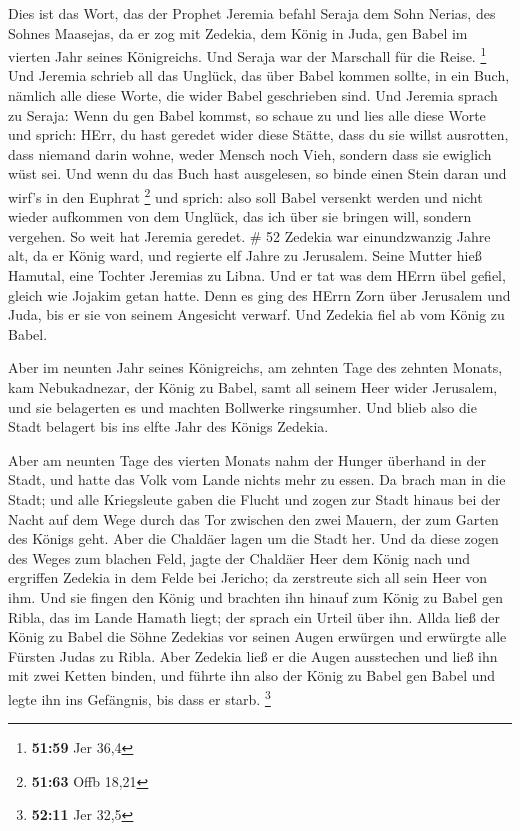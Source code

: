  Dies ist das Wort, das der Prophet Jeremia befahl Seraja
dem Sohn Nerias, des Sohnes Maasejas, da er zog mit Zedekia, dem König
in Juda, gen Babel im vierten Jahr seines Königreichs. Und Seraja war
der Marschall für die Reise. \footnote{\textbf{51:59} Jer 36,4}
 Und Jeremia schrieb all das Unglück, das über Babel kommen
sollte, in ein Buch, nämlich alle diese Worte, die wider Babel
geschrieben sind.  Und Jeremia sprach zu Seraja: Wenn du
gen Babel kommst, so schaue zu und lies alle diese Worte 
und sprich: HErr, du hast geredet wider diese Stätte, dass du sie willst
ausrotten, dass niemand darin wohne, weder Mensch noch Vieh, sondern
dass sie ewiglich wüst sei.  Und wenn du das Buch hast
ausgelesen, so binde einen Stein daran und wirf's in den Euphrat
\footnote{\textbf{51:63} Offb 18,21}  und sprich: also soll
Babel versenkt werden und nicht wieder aufkommen von dem Unglück, das
ich über sie bringen will, sondern vergehen. So weit hat Jeremia
geredet. \# 52  Zedekia war einundzwanzig Jahre alt, da er
König ward, und regierte elf Jahre zu Jerusalem. Seine Mutter hieß
Hamutal, eine Tochter Jeremias zu Libna.  Und er tat was dem
HErrn übel gefiel, gleich wie Jojakim getan hatte.  Denn es
ging des HErrn Zorn über Jerusalem und Juda, bis er sie von seinem
Angesicht verwarf. Und Zedekia fiel ab vom König zu Babel.

 Aber im neunten Jahr seines Königreichs, am zehnten Tage
des zehnten Monats, kam Nebukadnezar, der König zu Babel, samt all
seinem Heer wider Jerusalem, und sie belagerten es und machten Bollwerke
ringsumher.  Und blieb also die Stadt belagert bis ins elfte
Jahr des Königs Zedekia.

 Aber am neunten Tage des vierten Monats nahm der Hunger
überhand in der Stadt, und hatte das Volk vom Lande nichts mehr zu
essen.  Da brach man in die Stadt; und alle Kriegsleute
gaben die Flucht und zogen zur Stadt hinaus bei der Nacht auf dem Wege
durch das Tor zwischen den zwei Mauern, der zum Garten des Königs geht.
Aber die Chaldäer lagen um die Stadt her.  Und da diese
zogen des Weges zum blachen Feld, jagte der Chaldäer Heer dem König nach
und ergriffen Zedekia in dem Felde bei Jericho; da zerstreute sich all
sein Heer von ihm.  Und sie fingen den König und brachten
ihn hinauf zum König zu Babel gen Ribla, das im Lande Hamath liegt; der
sprach ein Urteil über ihn.  Allda ließ der König zu Babel
die Söhne Zedekias vor seinen Augen erwürgen und erwürgte alle Fürsten
Judas zu Ribla.  Aber Zedekia ließ er die Augen ausstechen
und ließ ihn mit zwei Ketten binden, und führte ihn also der König zu
Babel gen Babel und legte ihn ins Gefängnis, bis dass er starb.
\footnote{\textbf{52:11} Jer 32,5}


